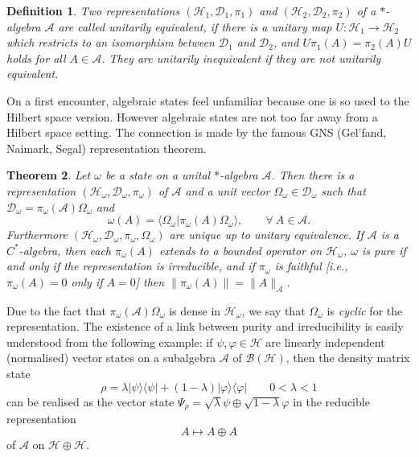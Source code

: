 \documentclass[12pt,a4paper]{article}
\newcommand{\1}{\mathds{1}}                         %
\newcommand{\BB}{{\mathcal{B}}}
\newcommand{\HH}{{\mathcal{H}}}
\newcommand{\DD}{{\mathscr{D}}}
\newcommand{\Ac}{{\mathcal{A}}}
\newcommand{\ip}[2]{\langle #1|#2\rangle}
\newcommand{\ket}[1]{|#1\rangle}
\newcommand{\bra}[1]{\langle #1|}
\newtheorem{theorem}{Theorem}%
\newtheorem{df}[theorem]{Definition}}
\begin{document}
\begin{df}
	Two representations $(\HH_1,\DD_1,\pi_1)$ and $(\HH_2,\DD_2,\pi_2)$ of a $*$-algebra $\Ac$ are called \emph{unitarily equivalent}, if
	there is a unitary map $U:\HH_1\rightarrow\HH_2$ which 
	restricts to an isomorphism between $\DD_1$ and $\DD_2$, and 
	$U\pi_1(A)=\pi_2(A) U$ holds for all $A\in\Ac$. They are \emph{unitarily inequivalent} if they are not unitarily equivalent.
\end{df} 

On a first encounter, algebraic states feel unfamiliar because one is so used to the Hilbert space version. However algebraic states are not too far away from a Hilbert space setting. The connection is made by the famous GNS (Gel'fand, Naimark, Segal) representation theorem. 
\begin{theorem} Let $\omega$ be a state on a unital $*$-algebra $\Ac$. 
	Then there is a representation $(\HH_\omega,\DD_\omega,\pi_\omega)$
	of $\Ac$ and a unit
	vector $\Omega_\omega\in\DD_\omega$ such that $\DD_\omega=\pi_\omega(\Ac)\Omega_\omega$ and
	\begin{equation}\label{eq:GNSprop}
	\omega(A) =\ip{\Omega_\omega}{\pi_\omega(A)\Omega_\omega}, \qquad \forall~A\in \Ac.
	\end{equation}
	Furthermore $(\HH_\omega,\DD_\omega,\pi_\omega,\Omega_\omega)$ are unique up to unitary equivalence. If $\Ac$ is a $C^*$-algebra,
	then each $\pi_\omega(A)$ extends to a bounded operator on $\HH_\omega$, 
	$\omega$ is pure if and only if the representation is irreducible, 
	and if $\pi_\omega$ is faithful [i.e., $\pi_\omega(A)=0$ only if $A=0$] then $\|\pi_\omega(A)\|=\|A\|_{\Ac}$.
\end{theorem}
Due to the fact that $\pi_\omega(\Ac)\Omega_\omega$ is dense in $\HH_\omega$, we say that $\Omega_\omega$ is \emph{cyclic} for the representation.
The existence of a link between purity and irreducibility is easily understood from the following example: if $\psi,\varphi\in\HH$ are linearly independent (normalised) vector states on a subalgebra $\Ac$ of $\BB(\HH)$, then the density matrix state
\[
\rho = \lambda \ket{\psi}\bra{\psi} + (1-\lambda)\ket{\varphi}\bra{\varphi}\qquad
0<\lambda<1
\]
can be realised as the vector state $\Psi_\rho=\sqrt{\lambda}\psi\oplus \sqrt{1-\lambda}\varphi$ in the reducible representation
\[
A\mapsto A\oplus A
\]
of $\Ac$ on $\HH\oplus\HH$.

\end{document}

